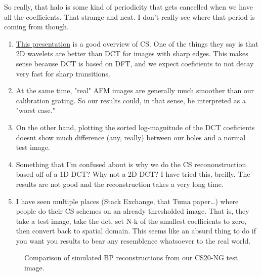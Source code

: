\documentclass[11pt]{article}
\begin{document}
So really, that halo is some kind of periodicity that gets cancelled when we have all the coefficients. That strange and neat. I don't really see where that period is coming from though.

\begin{enumerate}
\item \href{http://feihu.eng.ua.edu/compressive.pdf}{This presentation} is a good overview of CS. One of the things they say is that 2D wavelets are better than DCT for images with sharp edges. This makes sense because DCT is based on DFT, and we expect coeficients to not decay very fast for sharp transitions.
\item At the same time, "real" AFM images are generally much smoother than our calibration grating. So our results could, in that sense, be interpreted as a "worst case."
\item On the other hand, plotting the sorted log-magnitude of the DCT coeficients doesnt show much difference (any, really) between our holes and a normal test image.

\item Something that I'm confused about is why we do the CS recononstruction based off of a 1D DCT? Why not a 2D DCT? I have tried this, breifly. The results are not good and the reconstruction takes a very long time.

\item I have seen multiple places (Stack Exchange, that Tuma paper\ldots{}) where people do their CS schemes on an already thresholded image. That is, they take a test image, take the dct, set N-k of the smallest  coefficients to zero, then convert back to spatial domain. This seems like an absurd thing to do if you want you results to bear any resemblence whatsoever to the real world.
\end{enumerate}




\begin{figure}[htbp]
\centering

\caption{\label{fig:cs_sim_cp}
Comparison of simulated BP reconstructions from our CS20-NG test image.}
\end{figure}

% 
\FloatBarrier
\newpage
\newpage
\end{document}
